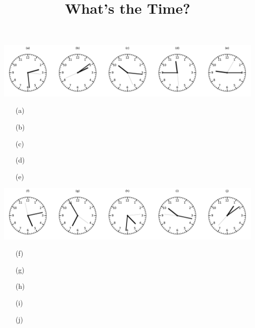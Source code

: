 \documentclass[a4paper, 11pt]{article}
\title{What's the Time?}
\date{}
\author{}
\begin{document}
\maketitle

\includegraphics[width=\textwidth]{clocks_4_0.pdf}
\begin{enumerate}\item[(a)] \dotfill\bigskip
\item[(b)] \dotfill\bigskip
\item[(c)] \dotfill\bigskip
\item[(d)] \dotfill\bigskip
\item[(e)] \dotfill\bigskip
\end{enumerate}\includegraphics[width=\textwidth]{clocks_4_1.pdf}
\begin{enumerate}\item[(f)] \dotfill\bigskip
\item[(g)] \dotfill\bigskip
\item[(h)] \dotfill\bigskip
\item[(i)] \dotfill\bigskip
\item[(j)] \dotfill\bigskip
\end{enumerate}
\end{document}
